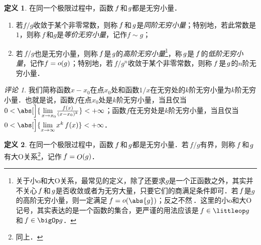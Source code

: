 \documentclass[a4paper,punct=CCT]{ctexbook}
\renewcommand*{\enumparen}[1]{（\makebox[0.6em][c]{\normalfont#1}）}
\theoremstyle{definition}
\newtheorem*{definition*}{定义}
\theoremstyle{remark}
\newtheorem*{remark}{评论}
\begin{document}
\begin{definition*}
  在同一个极限过程中，函数\(\,f\mkern2mu\)和\(\mkern1mu g\)都是无穷小量．
  \begin{enumerate}[topsep=3pt,itemsep=0ex]
    \renewcommand{\labelenumi}{\enumparen{\arabic{enumi}}}
  \item 若\(f/g\)收敛于某个非零常数，则称\(\,f\mkern2mu\)和\(\mkern2mu g\)是\emph{同阶无穷小量}；特别地，若此常数是\(1\)，则称\(\,f\,\)和\(g\)是\emph{等价无穷小量}，记作\(f \sim g\)；
  \item 若\(\,f/g\)也是无穷小量，则称\(\,f\mkern1mu\)是\(\mkern1mu g\)的\emph{高阶无穷小量}\footnote{关于小o和大O关系，最常见的定义，除了还要求\(g\)是一个正函数之外，其实并不关心\(\mkern2mu f\mkern2mu\)和\(\mkern2mu g\)是否收敛或者为无穷大量，只要它们的商满足条件即可．若\(\mkern2mu f\mkern1mu\)是\(g\)的高阶无穷小量，则一定满足\(\,f = \littleo(\abs{g})\)；反之不然\,．这里的小o和大O记号，其实表达的是一个函数的集合，更严谨的用法应该是\(\,f \in \littleop g\)和\(\,f \in \bigOp g\)．}，称\(\mkern2mu g\)是\(\,f\mkern2mu\)的\emph{低阶无穷小量}，记作\(f= \mathop{\relax o}\nolimits(g)\)；特别地，若\(\,f/g^n\)收敛于某个非零常数，则称\(\,f\mkern2mu\)是\(\mkern2mu g\)的\(n\)阶无穷小量．
  \end{enumerate}

  \begin{remark}
    我们简称函数\(x-x_0\)在点\(x_0\)处和函数\(1/x\)在无穷处的\(k\)阶无穷小量为\(k\)阶无穷小量．也就是说，函数\(f\)在点\(x_0\)处是\(k\)阶无穷小量，当且仅当\(0 < \abs[\Big]{\lim\limits_{\,x \to x_0\!} \frac{f(x)}{(x-x_0)^k}} < +\infty\)；函数\(f\)在无穷处是\(k\)阶无穷小量，当且仅当\(0 < \abs[\Big]{\lim\limits_{x\to\infty} x^k\,f(x)} < +\infty\)．
  \end{remark}
\end{definition*}

\begin{definition*}
  在同一个极限过程中，函数\(\,f\mkern2mu\)和\(\mkern2mu g\)都是无穷小量．若\(\,f/g\)有界，则称\(\,f\mkern2mu\)和\(\mkern2mu g\)有大O关系\footnote{同上．}，记作\(\,f = \mathop{\relax O}\nolimits(g)\)．
\end{definition*}
\end{document}
